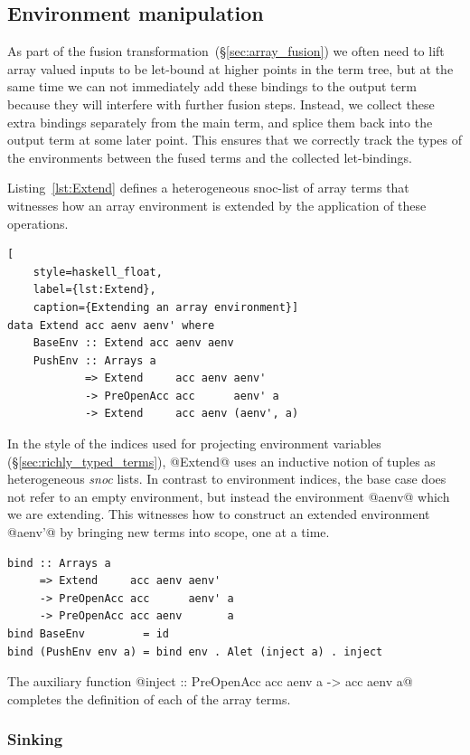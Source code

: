 \subsection{Environment manipulation}
\label{sec:environment_manipulation}

As part of the fusion transformation~(\S\ref{sec:array_fusion}) we often need to
lift array valued inputs to be let-bound at higher points in the term tree, but
at the same time we can not immediately add these bindings to the output term
because they will interfere with further fusion steps. Instead, we collect these
extra bindings separately from the main term, and splice them back into the
output term at some later point. This ensures that we correctly track the types
of the environments between the fused terms and the collected let-bindings.

Listing~\ref{lst:Extend} defines a heterogeneous snoc-list of array terms that
witnesses how an array environment is extended by the application of these
operations.
%
\begin{lstlisting}[
    style=haskell_float,
    label={lst:Extend},
    caption={Extending an array environment}]
data Extend acc aenv aenv' where
    BaseEnv :: Extend acc aenv aenv
    PushEnv :: Arrays a
            => Extend     acc aenv aenv'
            -> PreOpenAcc acc      aenv' a
            -> Extend     acc aenv (aenv', a)
\end{lstlisting}
%
In the style of the  indices used for projecting environment
variables (\S\ref{sec:richly_typed_terms}), @Extend@ uses an inductive notion of
tuples as heterogeneous \emph{snoc} lists. In contrast to environment indices,
the base case does not refer to an empty environment, but instead the
environment @aenv@ which we are extending. This witnesses how to construct an
extended environment @aenv'@ by bringing new terms into scope, one at a time.
%
\begin{lstlisting}[style=haskell]
bind :: Arrays a
     => Extend     acc aenv aenv'
     -> PreOpenAcc acc      aenv' a
     -> PreOpenAcc acc aenv       a
bind BaseEnv         = id
bind (PushEnv env a) = bind env . Alet (inject a) . inject
\end{lstlisting}
%
The auxiliary function @inject :: PreOpenAcc acc aenv a -> acc aenv a@ completes
the definition of each of the array terms.


\subsubsection{Sinking}
\label{sec:sinking}

